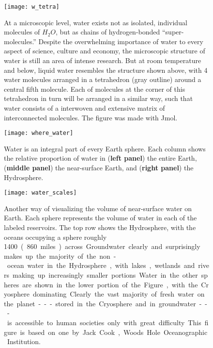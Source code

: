 \documentclass[amstex,12pt]{book}
\begin{document}
{\newpage
\begin{figure}[p]
\centering
  \texttt{[image: w\_tetra]}%
\caption{At a microscopic level, water exists not as isolated, individual molecules of $H_2O$, but as chains of hydrogen-bonded ``super-molecules.'' Despite the overwhelming importance of water to every aspect of science, culture and economy, the microscopic structure of water is still an area of intense research. But at room temperature and below, liquid water resembles the structure shown above, with 4 water molecules arranged in a tetrahedron (gray outline) around a central fifth molecule. Each of molecules at the corner of this tetrahedron in turn will be arranged in a similar way, such that water consists of a interwoven and extensive matrix of interconnected molecules. The figure was made with Jmol.}
\label{fig:w_tetra}
\end{figure}


\newpage
\begin{figure}[p]
\centering
  \texttt{[image: where\_water]}%
\caption{Water is an integral part of every Earth sphere. Each column shows the relative proportion of water in (\textbf{left panel}) the entire Earth, (\textbf{middle panel}) the near-surface Earth, and (\textbf{right panel}) the Hydrosphere.}
\label{fig:where_water}
\end{figure}

\newpage
\begin{figure}[p]
\centering
  \texttt{[image: water\_scales]}%
\caption{Another way of visualizing the volume of near-surface water on Earth. Each sphere represents the volume of water in each of the labeled reservoirs. The top row shows the Hydrosphere, with the oceans occupying a sphere roughly \SI{1400}[{\kilo}{\metre}] (860 miles) across. Groundwater clearly and surprisingly makes up the majority of the non-ocean water in the Hydrosphere, with lakes, wetlands and rivers making up increasingly smaller portions. Water in the other spheres are shown in the lower portion of the Figure, with the Cryosphere dominating. Clearly the vast majority of fresh water on the planet---stored in the Cryosphere and in groundwater---is accessible to human societies only with great difficulty. This figure is based on one by Jack Cook, Woods Hole Oceanographic Institution.}
\label{fig:water_scales}
\end{figure}


}
\end{document}
